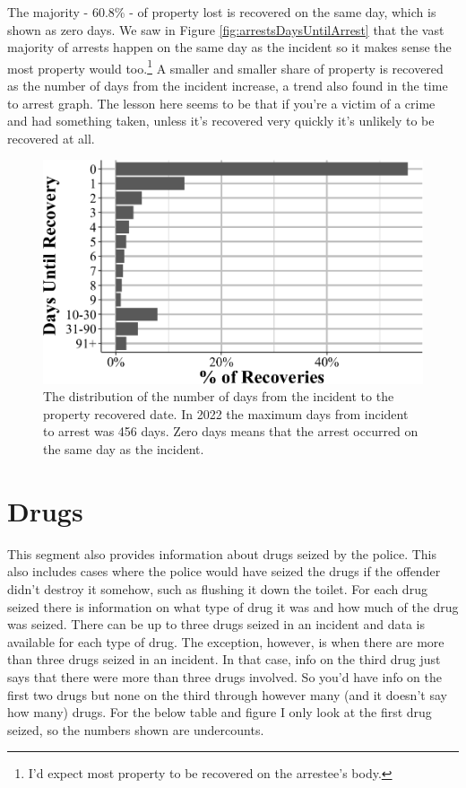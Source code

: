 \documentclass[
  12pt,
  openany]{book}
\begin{document}
The majority - 60.8\% - of property lost is recovered on the same day, which is shown as zero days. We saw in Figure \ref{fig:arrestsDaysUntilArrest} that the vast majority of arrests happen on the same day as the incident so it makes sense the most property would too.\footnote{I'd expect most property to be recovered on the arrestee's body.} A smaller and smaller share of property is recovered as the number of days from the incident increase, a trend also found in the time to arrest graph. The lesson here seems to be that if you're a victim of a crime and had something taken, unless it's recovered very quickly it's unlikely to be recovered at all.

\begin{figure}

{\centering \includegraphics[width=0.9\linewidth]{17_nibrs_property_files/figure-latex/propertyDaysUntilRecovered-1} 

}

\caption{The distribution of the number of days from the incident to the property recovered date. In 2022 the maximum days from incident to arrest was 456 days. Zero days means that the arrest occurred on the same day as the incident. }\label{fig:propertyDaysUntilRecovered}
\end{figure}

\section{Drugs}\label{drugs}

This segment also provides information about drugs seized by the police. This also includes cases where the police would have seized the drugs if the offender didn't destroy it somehow, such as flushing it down the toilet. For each drug seized there is information on what type of drug it was and how much of the drug was seized. There can be up to three drugs seized in an incident and data is available for each type of drug. The exception, however, is when there are more than three drugs seized in an incident. In that case, info on the third drug just says that there were more than three drugs involved. So you'd have info on the first two drugs but none on the third through however many (and it doesn't say how many) drugs. For the below table and figure I only look at the first drug seized, so the numbers shown are undercounts.
\end{document}
